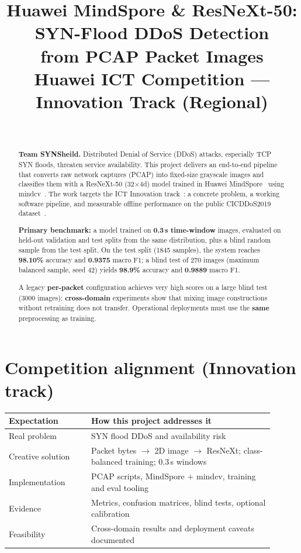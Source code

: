 \documentclass[11pt,a4paper]{article}
\title{%
  Huawei MindSpore \& ResNeXt-50: SYN-Flood DDoS Detection\\
  from PCAP Packet Images\\[0.5em]
  \large Huawei ICT Competition --- Innovation Track (Regional)}
\author{\TeamName\\\Institution}
\date{\SubmissionDate}
\newcommand{\TeamName}{SYNSheild}
\begin{document}
\maketitle

\begin{abstract}
\noindent\textbf{Team \TeamName.} Distributed Denial of Service (DDoS) attacks, especially TCP SYN floods, threaten service availability. This project delivers an end-to-end pipeline that converts raw network captures (PCAP) into fixed-size grayscale images and classifies them with a ResNeXt-50 (32$\times$4d) model trained in Huawei MindSpore~\cite{mindspore} using mindcv~\cite{mindcv}. The work targets the ICT Innovation track~\cite{ictcompetition}: a concrete problem, a working software pipeline, and measurable offline performance on the public CICDDoS2019 dataset~\cite{cicddos2019}.

\textbf{Primary benchmark:} a model trained on \textbf{0.3\,s time-window} images, evaluated on held-out validation and test splits from the same distribution, plus a blind random sample from the test split. On the test split (1845 samples), the system reaches \textbf{98.10\%} accuracy and \textbf{0.9375} macro F1; a blind test of 270 images (maximum balanced sample, seed 42) yields \textbf{98.9\%} accuracy and \textbf{0.9889} macro F1.

A legacy \textbf{per-packet} configuration achieves very high scores on a large blind test (3000 images); \textbf{cross-domain} experiments show that mixing image constructions without retraining does not transfer. Operational deployments must use the \textbf{same} preprocessing as training.
\end{abstract}

\tableofcontents
\clearpage

\section{Competition alignment (Innovation track)}

\begin{table}[h]
  \centering
  \small
  \begin{tabular}{@{}p{0.28\linewidth}p{0.62\linewidth}@{}}
    \toprule
    Expectation & How this project addresses it \\
    \midrule
    Real problem & SYN flood DDoS and availability risk \\
    Creative solution & Packet bytes $\rightarrow$ 2D image $\rightarrow$ ResNeXt; class-balanced training; 0.3\,s windows \\
    Implementation & PCAP scripts, MindSpore + mindcv, training and eval tooling \\
    Evidence & Metrics, confusion matrices, blind tests, optional calibration \\
    Feasibility & Cross-domain results and deployment caveats documented \\
    \bottomrule
  \end{tabular}
\end{table}
\end{document}
